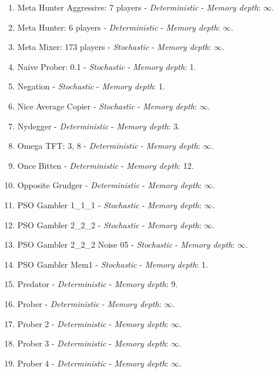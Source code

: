 \documentclass[10pt,letterpaper]{article}
\begin{document}
\begin{enumerate}
\item Meta Hunter Aggressive: 7 players - \textit{Deterministic} - \textit{Memory depth}: \(\infty\). \cite{axelrodproject}
\item Meta Hunter: 6 players - \textit{Deterministic} - \textit{Memory depth}: \(\infty\). \cite{axelrodproject}
\item Meta Mixer: 173 players - \textit{Stochastic} - \textit{Memory depth}: \(\infty\). \cite{axelrodproject}
\item Naive Prober: 0.1 - \textit{Stochastic} - \textit{Memory depth}: 1. \cite{Li2011}
\item Negation - \textit{Stochastic} - \textit{Memory depth}: 1. \cite{PD2017}
\item Nice Average Copier - \textit{Stochastic} - \textit{Memory depth}: \(\infty\). \cite{axelrodproject}
\item Nydegger - \textit{Deterministic} - \textit{Memory depth}: 3. \cite{Axelrod1980}
\item Omega TFT: 3, 8 - \textit{Deterministic} - \textit{Memory depth}: \(\infty\). \cite{kendall2007iterated}
\item Once Bitten - \textit{Deterministic} - \textit{Memory depth}: 12. \cite{axelrodproject}
\item Opposite Grudger - \textit{Deterministic} - \textit{Memory depth}: \(\infty\). \cite{axelrodproject}
\item PSO Gambler 1\_1\_1 - \textit{Stochastic} - \textit{Memory depth}: \(\infty\). \cite{axelrodproject}
\item PSO Gambler 2\_2\_2 - \textit{Stochastic} - \textit{Memory depth}: \(\infty\). \cite{axelrodproject}
\item PSO Gambler 2\_2\_2 Noise 05 - \textit{Stochastic} - \textit{Memory depth}: \(\infty\). \cite{axelrodproject}
\item PSO Gambler Mem1 - \textit{Stochastic} - \textit{Memory depth}: 1. \cite{axelrodproject}
\item Predator - \textit{Deterministic} - \textit{Memory depth}: 9. \cite{Ashlock2006b}
\item Prober - \textit{Deterministic} - \textit{Memory depth}: \(\infty\). \cite{Li2011}
\item Prober 2 - \textit{Deterministic} - \textit{Memory depth}: \(\infty\). \cite{Prison1998}
\item Prober 3 - \textit{Deterministic} - \textit{Memory depth}: \(\infty\). \cite{Prison1998}
\item Prober 4 - \textit{Deterministic} - \textit{Memory depth}: \(\infty\). \cite{Prison1998}

\end{enumerate}
\end{document}
